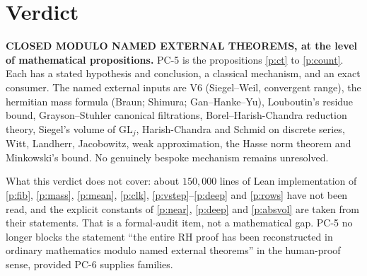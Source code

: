 \documentclass[11pt]{article}
\newcommand{\PC}[1]{\textsf{PC-#1}}
\theoremstyle{remark}
\begin{document}
\section*{Verdict}

\textbf{CLOSED MODULO NAMED EXTERNAL THEOREMS, at the level of mathematical propositions.} \PC{5} is the propositions \ref{p:ct} to \ref{p:count}. Each has a stated hypothesis and conclusion, a classical mechanism, and an exact consumer. The named external inputs are V6 (Siegel--Weil, convergent range), the hermitian mass formula (Braun; Shimura; Gan--Hanke--Yu), Louboutin's residue bound, Grayson--Stuhler canonical filtrations, Borel--Harish-Chandra reduction theory, Siegel's volume of $\mathrm{GL}_j$, Harish-Chandra and Schmid on discrete series, Witt, Landherr, Jacobowitz, weak approximation, the Hasse norm theorem and Minkowski's bound. No genuinely bespoke mechanism remains unresolved.

What this verdict does not cover: about $150{,}000$ lines of Lean implementation of \ref{p:fib}, \ref{p:mass}, \ref{p:mean}, \ref{p:clk}, \ref{p:vstep}--\ref{p:deep} and \ref{p:rows} have not been read, and the explicit constants of \ref{p:near}, \ref{p:deep} and \ref{p:absvol} are taken from their statements. That is a formal-audit item, not a mathematical gap. \PC{5} no longer blocks the statement ``the entire RH proof has been reconstructed in ordinary mathematics modulo named external theorems'' in the human-proof sense, provided \PC{6} supplies  families.
\end{document}
